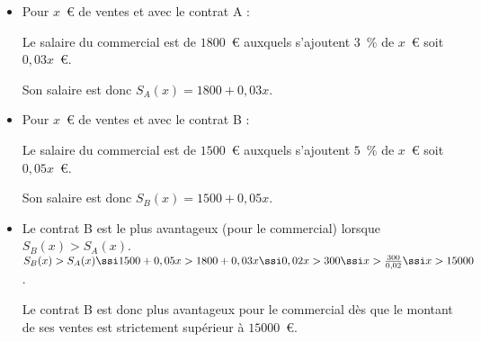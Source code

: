 %
%
%
%
\begin{exr}
  \begin{itemize}
  \item Pour $x$~\euro{} de ventes et avec le contrat A :

Le salaire du commercial est de  $1800$~€ auxquels s'ajoutent $3$~\% de $x$~\euro{} soit $0,03x$~\euro{}.

Son salaire est donc $S_A(x)=1800+0,03x$. 
  \item Pour $x$~\euro{} de ventes et avec le contrat B : 

Le salaire du commercial est de  $1500$~€ auxquels s'ajoutent $5$~\% de $x$~\euro{} soit $0,05x$~\euro{}.

Son salaire est donc $S_B(x)=1500+0,05x$. 
  \item Le contrat B est le plus avantageux (pour le commercial) lorsque $S_B(x)>S_A(x)$.\newline
$S_B(x)>S_A(x) \ssi 1500+0,05x>1800+0,03x \ssi 0,02x>300 \ssi x>\frac{300}{0,02} \ssi x>15000$.

Le contrat B est donc plus avantageux pour le commercial dès que le montant de ses ventes est strictement supérieur à $15000$~€.
  \end{itemize}
\end{exr}
%
%
%
